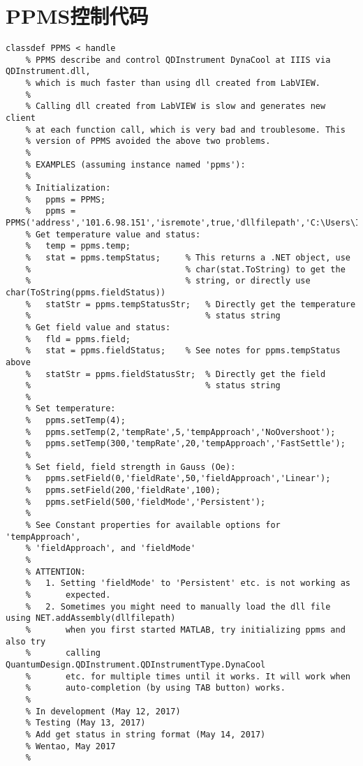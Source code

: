 
  \section{PPMS控制代码} %
  \label{sec:ppms控制代码}
  \begin{lstlisting}
classdef PPMS < handle
    % PPMS describe and control QDInstrument DynaCool at IIIS via QDInstrument.dll,
    % which is much faster than using dll created from LabVIEW.
    %
    % Calling dll created from LabVIEW is slow and generates new client
    % at each function call, which is very bad and troublesome. This
    % version of PPMS avoided the above two problems.
    %
    % EXAMPLES (assuming instance named 'ppms'):
    %
    % Initialization:
    %   ppms = PPMS;
    %   ppms = PPMS('address','101.6.98.151','isremote',true,'dllfilepath','C:\Users\IIIS\Documents\MATLAB\PPMS\QDInstrument.dll');
    % Get temperature value and status:
    %   temp = ppms.temp;
    %   stat = ppms.tempStatus;     % This returns a .NET object, use
    %                               % char(stat.ToString) to get the
    %                               % string, or directly use char(ToString(ppms.fieldStatus))
    %   statStr = ppms.tempStatusStr;   % Directly get the temperature
    %                                   % status string
    % Get field value and status:
    %   fld = ppms.field;
    %   stat = ppms.fieldStatus;    % See notes for ppms.tempStatus above
    %   statStr = ppms.fieldStatusStr;  % Directly get the field
    %                                   % status string
    %
    % Set temperature:
    %   ppms.setTemp(4);
    %   ppms.setTemp(2,'tempRate',5,'tempApproach','NoOvershoot');
    %   ppms.setTemp(300,'tempRate',20,'tempApproach','FastSettle');
    %
    % Set field, field strength in Gauss (Oe):
    %   ppms.setField(0,'fieldRate',50,'fieldApproach','Linear');
    %   ppms.setField(200,'fieldRate',100);
    %   ppms.setField(500,'fieldMode','Persistent');
    % 
    % See Constant properties for available options for 'tempApproach',
    % 'fieldApproach', and 'fieldMode'
    %
    % ATTENTION: 
    %   1. Setting 'fieldMode' to 'Persistent' etc. is not working as
    %       expected.
    %   2. Sometimes you might need to manually load the dll file using NET.addAssembly(dllfilepath)
    %       when you first started MATLAB, try initializing ppms and also try
    %       calling QuantumDesign.QDInstrument.QDInstrumentType.DynaCool
    %       etc. for multiple times until it works. It will work when
    %       auto-completion (by using TAB button) works.
    %
    % In development (May 12, 2017)
    % Testing (May 13, 2017)
    % Add get status in string format (May 14, 2017)
    % Wentao, May 2017
    %


\end{lstlisting}
